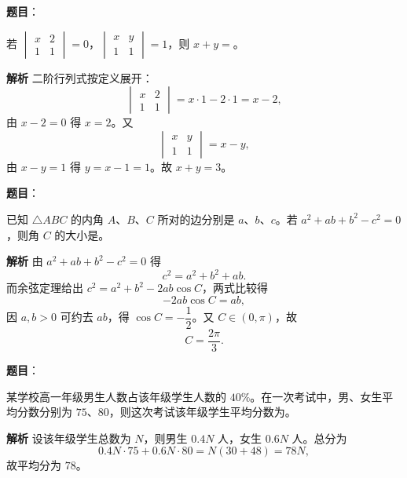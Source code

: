 \begin{answer}

\textbf{题目}：

若 $\begin{vmatrix}x&2\\1&1\end{vmatrix}=0$，$\begin{vmatrix}x&y\\1&1\end{vmatrix}=1$，则 $x+y=$\gkblank{}。

\textbf{解析}
二阶行列式按定义展开：
\nopagebreak[4]
\[\begin{vmatrix}x&2\\1&1\end{vmatrix}=x\cdot1-2\cdot1=x-2,\]
由 $x-2=0$ 得 $x=2$。又
\nopagebreak[4]
\[\begin{vmatrix}x&y\\1&1\end{vmatrix}=x-y,\]
由 $x-y=1$ 得 $y=x-1=1$。故 $x+y=3$。


\end{answer}
\begin{answer}

\textbf{题目}：

已知 $\triangle ABC$ 的内角 $A$、$B$、$C$ 所对的边分别是 $a$、$b$、$c$。若 $a^2+ab+b^2-c^2=0$，则角 $C$ 的大小是\gkblank{}。

\textbf{解析}
由 $a^2+ab+b^2-c^2=0$ 得
\nopagebreak[4]
\[c^2=a^2+b^2+ab.\]
而余弦定理给出 $c^2=a^2+b^2-2ab\cos C$，两式比较得
\nopagebreak[4]
\[-2ab\cos C=ab,\]
因 $a,b>0$ 可约去 $ab$，得 $\cos C=-\dfrac12$。又 $C\in(0,\pi)$，故
\nopagebreak[4]
\[C=\frac{2\pi}3.\]


\end{answer}
\begin{answer}

\textbf{题目}：

某学校高一年级男生人数占该年级学生人数的 $40\%$。在一次考试中，男、女生平均分数分别为 $75$、$80$，则这次考试该年级学生平均分数为\gkblank{}。

\textbf{解析}
设该年级学生总数为 $N$，则男生 $0.4N$ 人，女生 $0.6N$ 人。总分为
\nopagebreak[4]
\[0.4N\cdot75+0.6N\cdot80=N(30+48)=78N,\]
故平均分为 $78$。


\end{answer}
